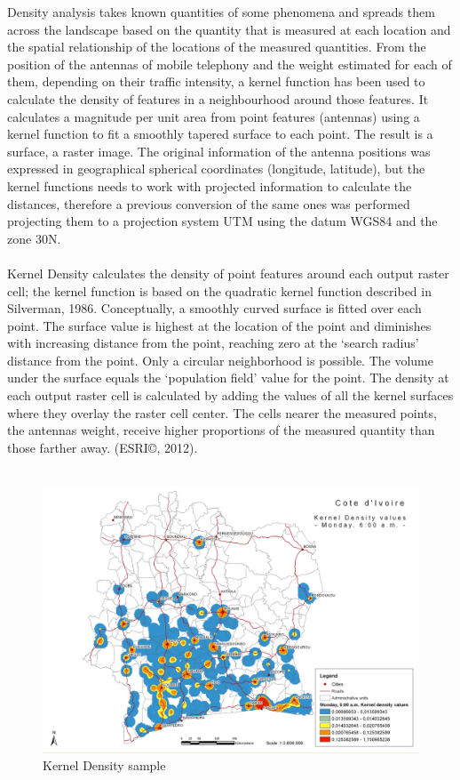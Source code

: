 \newpage
Density analysis takes known quantities of some phenomena and spreads them across the landscape based on the quantity that is measured at each location and the spatial relationship of the locations of the measured quantities. From the position of the antennas of mobile telephony and the weight estimated for each of them, depending on their traffic intensity, a kernel function has been used to calculate the density of features in a neighbourhood around those features. It calculates a magnitude per unit area from point features (antennas) using a kernel function to fit a smoothly tapered surface to each point. The result is a surface, a raster image. The original information of the antenna positions was expressed in geographical spherical coordinates (longitude, latitude), but the kernel functions needs to work with  projected information to calculate the distances, therefore a previous conversion of the same ones was performed projecting them to a projection system UTM using the datum WGS84 and the zone 30N.
\\
\\
Kernel Density calculates the density of point features around each output raster cell; the kernel function is based on the quadratic kernel function described in Silverman, 1986. Conceptually, a smoothly curved surface is fitted over each point. The surface value is highest at the location of the point and diminishes with increasing distance from the point, reaching zero at the ‘search radius’ distance from the point. Only a circular neighborhood is possible. The volume under the surface equals the ‘population field’ value for the point. The density at each output raster cell is calculated by adding the values of all the kernel surfaces where they overlay the raster cell center. The cells nearer the measured points, the antennas weight, receive higher proportions of the measured quantity than those farther away. (ESRI©, 2012).
\\
\\
\begin{figure}[h]
\begin{center}
\includegraphics[scale = 0.3] {results/images/kernel/L_hour6_kd_Map.pdf}
\caption{Kernel Density sample}
\label{fig:ks_sample}
\end{center}
\end{figure}



